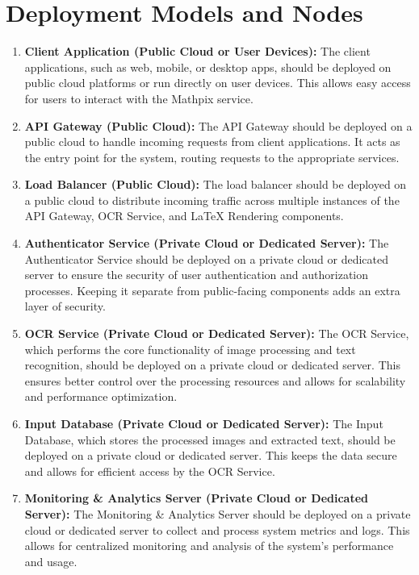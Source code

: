 \documentclass{article}
\begin{document}
\section{Deployment Models and Nodes}
\begin{enumerate}
    \item \textbf{Client Application (Public Cloud or User Devices):}
    The client applications, such as web, mobile, or desktop apps, should be deployed on public cloud platforms or run directly on user devices. This allows easy access for users to interact with the Mathpix service.
    
    \item \textbf{API Gateway (Public Cloud):}
    The API Gateway should be deployed on a public cloud to handle incoming requests from client applications. It acts as the entry point for the system, routing requests to the appropriate services.

    \item \textbf{Load Balancer (Public Cloud):}
    The load balancer should be deployed on a public cloud to distribute incoming traffic across multiple instances of the API Gateway, OCR Service, and LaTeX Rendering components.
    
    \item \textbf{Authenticator Service (Private Cloud or Dedicated Server):}
    The Authenticator Service should be deployed on a private cloud or dedicated server to ensure the security of user authentication and authorization processes. Keeping it separate from public-facing components adds an extra layer of security.
    
    \item \textbf{OCR Service (Private Cloud or Dedicated Server):}
    The OCR Service, which performs the core functionality of image processing and text recognition, should be deployed on a private cloud or dedicated server. This ensures better control over the processing resources and allows for scalability and performance optimization.
    
    \item \textbf{Input Database (Private Cloud or Dedicated Server):}
    The Input Database, which stores the processed images and extracted text, should be deployed on a private cloud or dedicated server. This keeps the data secure and allows for efficient access by the OCR Service.
    
    \item \textbf{Monitoring \& Analytics Server (Private Cloud or Dedicated Server):}
    The Monitoring \& Analytics Server should be deployed on a private cloud or dedicated server to collect and process system metrics and logs. This allows for centralized monitoring and analysis of the system's performance and usage.
    

\end{enumerate}
\end{document}
